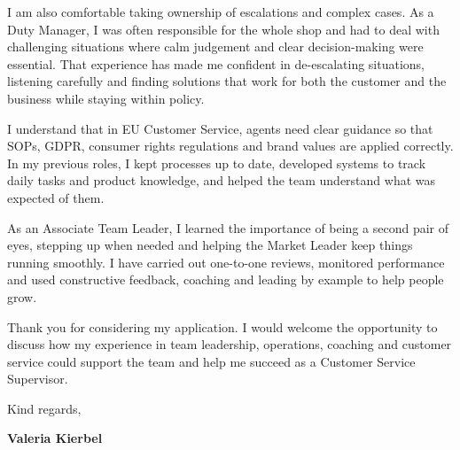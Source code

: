 \documentclass[10pt,a4paper]{article}
\begin{document}
I am also comfortable taking ownership of escalations and complex cases. As a Duty Manager, I was often responsible for the whole shop and had to deal with challenging situations where calm judgement and clear decision-making were essential. That experience has made me confident in de-escalating situations, listening carefully and finding solutions that work for both the customer and the business while staying within policy.

I understand that in EU Customer Service, agents need clear guidance so that SOPs, GDPR, consumer rights regulations and brand values are applied correctly. In my previous roles, I kept processes up to date, developed systems to track daily tasks and product knowledge, and helped the team understand what was expected of them.

As an Associate Team Leader, I learned the importance of being a second pair of eyes, stepping up when needed and helping the Market Leader keep things running smoothly. I have carried out one-to-one reviews, monitored performance and used constructive feedback, coaching and leading by example to help people grow.

Thank you for considering my application. I would welcome the opportunity to discuss how my experience in team leadership, operations, coaching and customer service could support the team and help me succeed as a Customer Service Supervisor.

\vspace{4pt}

Kind regards,

\textbf{Valeria Kierbel}
\end{document}
